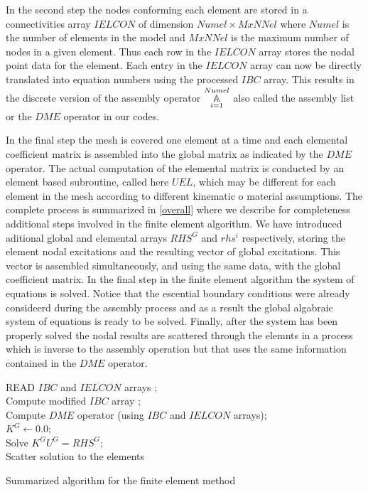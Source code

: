In the second step the nodes conforming each element are stored in a connectivities array  $IELCON$ of dimension $Numel \times MxNNel$ where $Numel$ is the number of elements in the model and $MxNNel$ is the maximum number of nodes in a given element. Thus each row in the $IELCON$ array stores the nodal point data for the element. Each entry in the $IELCON$ array can now be directly translated into equation numbers using the processed $IBC$ array. This results in the discrete version of the assembly operator $\assem{i=1}{Numel}$ also called the assembly list or the $DME$ operator in our codes.

In the final step the mesh is covered one element at a time and each elemental coefficient matrix is assembled into the global matrix as indicated by the $DME$ operator. The actual computation of the elemental matrix is conducted by an element based subroutine, called here $UEL$, which may be different for each element in the mesh according to different kinematic o material assumptions. The complete process is summarized in \cref{overall} where we describe for completeness additional steps involved in the finite element algorithm. We have introduced aditional global and elemental arrays $RHS^G$ and $rhs^i$ respectively, storing the element nodal excitations and the resulting vector of global excitations. This vector is assembled simultaneously, and using the same data, with the global coefficient matrix. In the final step in the finite element algorithm the system of equations is solved. Notice that the escential boundary conditions were already consideerd during the assembly process and as a result the global algabraic system of equations is ready to be solved. Finally, after the system has been properly solved the nodal results are scattered through the elemnts in a process which is inverse to the assembly operation but that uses the same information contained in the $DME$ operator.\\

\begin{algorithm}[H]
\SetAlgoLined
{}
\BlankLine
READ $IBC$ and $IELCON$ arrays ;\\
Compute modified $IBC$ array ;\\
Compute $DME$ operator (using $IBC$ and $IELCON$ arrays);\\
$K^G \leftarrow 0.0$;\\
\BlankLine
{}
\BlankLine
Solve ${K^G}{U^G} = RH{S^G}$;\\
Scatter solution to the elements
\caption{Summarized algorithm for the finite element method}
\label{overall}
\end{algorithm}
\newpage
